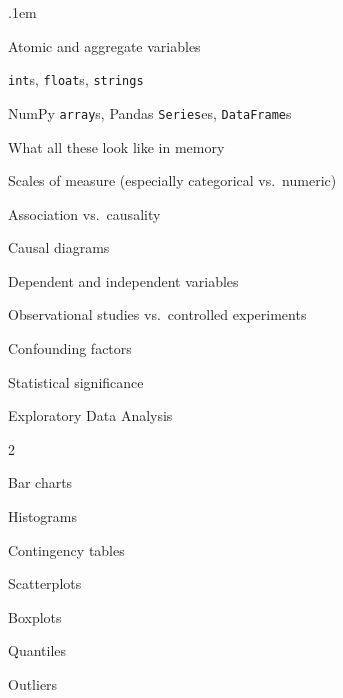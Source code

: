 \begin{compactitem}
\small
\itemsep.1em
\item Atomic and aggregate variables

\begin{compactitem}
\item \texttt{int}s, \texttt{float}s, \texttt{strings}
\item NumPy \texttt{array}s, Pandas \texttt{Series}es, \texttt{DataFrame}s
\item What all these look like in memory
\end{compactitem}

\item Scales of measure (especially categorical vs.~numeric)

\item Association vs.~causality

\begin{compactitem}
\item Causal diagrams
\item Dependent and independent variables
\item Observational studies vs.~controlled experiments
\item Confounding factors
\end{compactitem}

\item Statistical significance

\item Exploratory Data Analysis
\vspace{-.18in}
\begin{multicols}{2}
    \begin{compactitem}
    \item Bar charts
    \item Histograms
    \item Contingency tables
    \item Scatterplots
    \item Boxplots
    \item Quantiles
    \item Outliers
    \end{compactitem}
\end{multicols}
\vspace{-.18in}


\end{compactitem}
